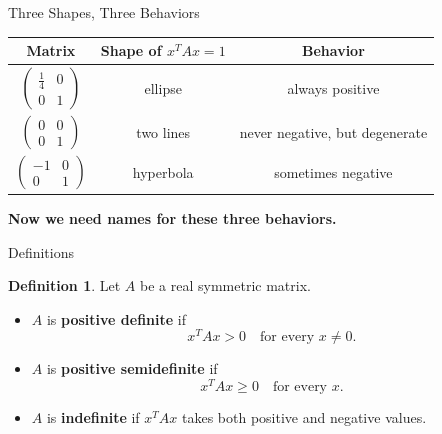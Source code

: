 \documentclass[10pt]{beamer}
\theoremstyle{definition}
\newtheorem{defi}{Definition}[section]
\newcommand{\x}[1]{\alert{\textbf{#1}}}
\begin{document}
\begin{frame}{Three Shapes, Three Behaviors}

\begin{center}
\renewcommand{\arraystretch}{1.35}
\begin{tabular}{c|c|c}
\textbf{Matrix} & \textbf{Shape of $x^TAx=1$} & \textbf{Behavior}\\
\hline
$\begin{pmatrix}\frac14&0\\0&1\end{pmatrix}$ & ellipse & always positive\\
$\begin{pmatrix}0&0\\0&1\end{pmatrix}$ & two lines & never negative, but degenerate\\
$\begin{pmatrix}-1&0\\0&1\end{pmatrix}$ & hyperbola & sometimes negative
\end{tabular}
\end{center}

\vfill

\begin{center}
\x{Now we need names for these three behaviors.}
\end{center}

\end{frame}


\begin{frame}{Definitions}

\begin{defi}
Let $A$ be a real symmetric matrix.
\begin{itemize}
\item $A$ is \x{positive definite} if
$$
x^TAx>0\quad\text{for every }x\ne0.
$$
\item $A$ is \x{positive semidefinite} if
$$
x^TAx\ge0\quad\text{for every }x.
$$
\item $A$ is \x{indefinite} if $x^TAx$ takes both positive and negative values.
\end{itemize}
\end{defi}

\end{frame}


\end{document}
